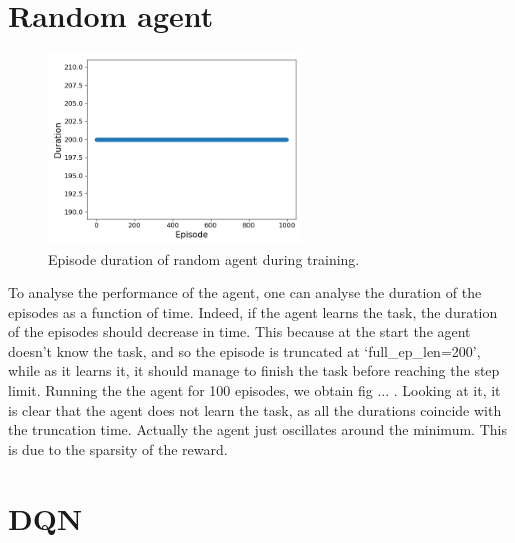 \documentclass[a4paper, 12pt,oneside]{article}
\begin{document}
    \section{Random agent}
    \begin{figure}
        \centering
        \vspace{-1em}
        \includegraphics[width=0.6\textwidth]{../runs/random/n_eps=1000/figs/duration}
        \caption{Episode duration of random agent during training.}
        \label{fig:random-neps=1000}
    \end{figure}
    To analyse the performance of the agent, one can analyse the duration of the episodes as a function of time. Indeed, if the agent learns the task, the duration of the episodes should decrease in time. This because at the start the agent doesn't know the task, and so the episode is truncated at `full\_ep\_len=200', while as it learns it, it should manage to finish the task before reaching the step limit.
    Running the the agent for 100 episodes, we obtain fig ... . Looking at it, it is clear that the agent does not learn the task, as all the durations coincide with the truncation time. Actually the agent just oscillates around the minimum. This is due to the sparsity of the reward. 
    \section{DQN}
\end{document}
